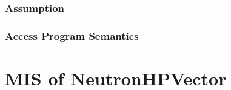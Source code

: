 \documentclass[12pt]{article}
\begin{document}
\subsubsection{Assumption}%

\subsubsection{Access Program Semantics}%


\section{MIS of NeutronHPVector}
\end{document}
